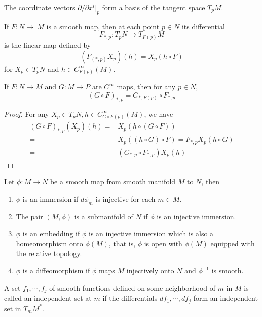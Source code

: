 \begin{proposition}
    The coordinate vectors $\partial/\partial x^i|_p$ form a basis of the tangent space $T_p M$.
\end{proposition}

\begin{definition}
    If $F:N\to\ M$ is a smooth map, then at each point $p\in N$ its differential
    \[
    F_{*,p}:T_pN\to T_{F(p)} M
    \]
    is the linear map defined by
    \[
    (F_(*,p) X_p)(h) = X_p(h\circ F)
    \]
    for $X_p \in T_pN$ and $h\in C^{\infty}_{F(p)}(M)$.
\end{definition}

\begin{proposition}
    If $F: N \to M$ and $G: M \to P$ are $C^{\infty}$ maps, then for any $p\in N$,
    \[(G\circ F)_{*,p} = G_{*,F(p)} \circ F_{*,p}\]
\end{proposition}
\begin{proof}
    For any $X_p \in T_pN, h\in C^{\infty}_{G\circ F(p)}(M)$, we have
    \[
        \begin{aligned}
            (G\circ F)_{*,p}(X_p)(h) =& X_p(h\circ (G\circ F)) \\ =& X_p((h\circ G) \circ F) = F_{*,p}X_p(h\circ G) \\ =& (G_{*,p} \circ F_{*,p} )X_p(h)
        \end{aligned}
    \]
\end{proof}

\begin{definition}
    Let $\phi:M\to N$ be a smooth map from smooth manifold $M$ to $N$, then
    \begin{enumerate}
        \item[(a)] $\phi$ is an immersion if $d\phi_m$ is injective for each $m\in M$.
        \item[(b)] The pair $(M,\phi)$ is a submanifold of $N$ if $\phi$ is an injective immersion.
        \item[(c)] $\phi$ is an embedding if $\phi$ is an injective immersion which is also a homeomorphism onto $\phi(M)$, that is, $\phi$ is open with $\phi(M)$ equipped with the relative topology.
        \item[(d)] $\phi$ is a diffeomorphism if $\phi$ maps $M$ injectively onto $N$ and $\phi^{-1}$ is smooth.
    \end{enumerate}    
\end{definition}

\begin{definition}
    A set $f_1,\cdots,f_j$ of smooth functions defined on some neighborhood of $m$ in $M$ is called an independent set at $m$ if the differentials $df_1,\cdots,df_j$ form an independent set in $T_mM^*$.
\end{definition}

